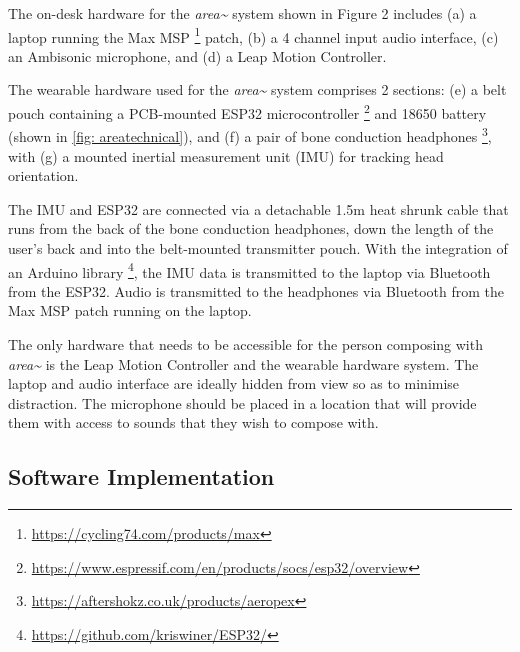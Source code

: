 The on-desk hardware for the \textit{area\textasciitilde{}} system shown in Figure 2 includes (a) a laptop running the Max MSP \footnote{\url{https://cycling74.com/products/max}} patch, (b) a 4 channel input audio interface, (c) an Ambisonic microphone, and (d) a Leap Motion Controller.

The wearable hardware used for the \textit{area\textasciitilde{}} system comprises 2 sections: (e) a belt pouch containing a PCB-mounted ESP32 microcontroller \footnote{\url{https://www.espressif.com/en/products/socs/esp32/overview}} and 18650 battery (shown in \autoref{fig: areatechnical}), and (f) a pair of bone conduction headphones \footnote{\url{https://aftershokz.co.uk/products/aeropex}}, with (g) a mounted inertial measurement unit (IMU) for tracking head orientation. 

The IMU and ESP32 are connected via a detachable 1.5m heat shrunk cable that runs from the back of the bone conduction headphones, down the length of the user's back and into the belt-mounted transmitter pouch. With the integration of an Arduino library \footnote{\url{https://github.com/kriswiner/ESP32/}}, the IMU data is transmitted to the laptop via Bluetooth from the ESP32. Audio is transmitted to the headphones via Bluetooth from the Max MSP patch running on the laptop. 

The only hardware that needs to be accessible for the person composing with \textit{area\textasciitilde{}} is the Leap Motion Controller and the wearable hardware system. The laptop and audio interface are ideally hidden from view so as to minimise distraction. The microphone should be placed in a location that will provide them with access to sounds that they wish to compose with.

\subsection{Software Implementation}\label{sec: area-system-software}

